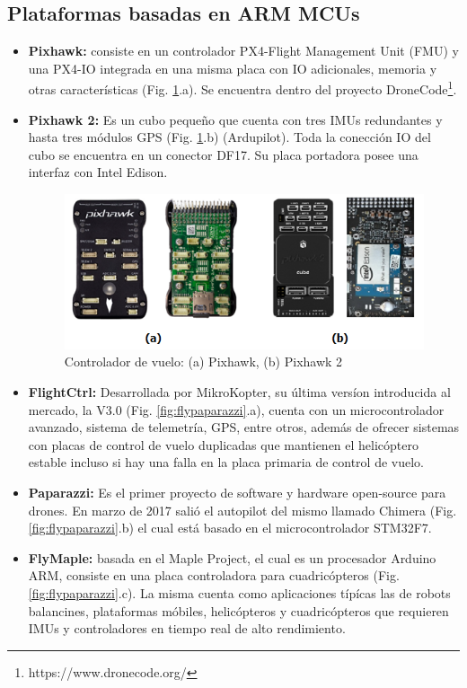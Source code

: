 \subsection{Plataformas basadas en ARM MCUs}
\begin{itemize}
    \item \textbf{Pixhawk:} consiste en un controlador PX4-Flight Management Unit (FMU) y una PX4-IO integrada en una misma placa con IO adicionales, memoria y otras características (Fig. \ref{fig:pixhawks}.a). Se encuentra dentro del proyecto DroneCode\footnote{https://www.dronecode.org/}.
    \item \textbf{Pixhawk 2:} Es un cubo pequeño que cuenta con tres IMUs redundantes y hasta tres módulos GPS (Fig. \ref{fig:pixhawks}.b) (Ardupilot). Toda la conección IO del cubo se encuentra en un conector DF17. Su placa portadora posee una interfaz con Intel Edison.
    
    \begin{figure}[!ht]
        \centering
        \includegraphics[width=.95\textwidth]{Img/pixhawks}
        \caption{Controlador de vuelo: (a) Pixhawk, (b) Pixhawk 2}
        \label{fig:pixhawks}
    \end{figure}
    
    \item \textbf{FlightCtrl:} Desarrollada por MikroKopter, su última versíon introducida al mercado, la V3.0 (Fig. \ref{fig:flypaparazzi}.a), cuenta con un microcontrolador avanzado, sistema de telemetría, GPS, entre otros, además de ofrecer sistemas con placas de control de vuelo duplicadas que mantienen el helicóptero estable incluso si hay una falla en la placa primaria de control de vuelo.
    \item \textbf{Paparazzi:} Es el primer proyecto de software y hardware open-source para drones. En marzo de 2017 salió el autopilot del mismo llamado Chimera (Fig. \ref{fig:flypaparazzi}.b) el cual está basado en el microcontrolador STM32F7.
    \item \textbf{FlyMaple:} basada en el Maple Project, el cual es un procesador Arduino ARM, consiste en una placa controladora para cuadricópteros (Fig. \ref{fig:flypaparazzi}.c). La misma cuenta como aplicaciones típícas las de robots balancines, plataformas móbiles, helicópteros y cuadricópteros que requieren IMUs y controladores en tiempo real de alto rendimiento.
    

\end{itemize}
